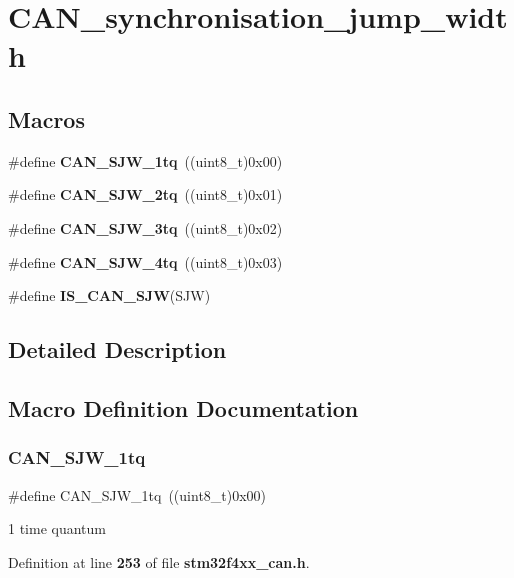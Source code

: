 \section{C\+A\+N\+\_\+synchronisation\+\_\+jump\+\_\+width}
\label{group__CAN__synchronisation__jump__width}
\subsection*{Macros}
\begin{DoxyCompactItemize}
\item 
\#define \textbf{ C\+A\+N\+\_\+\+S\+J\+W\+\_\+1tq}~((uint8\+\_\+t)0x00)
\item 
\#define \textbf{ C\+A\+N\+\_\+\+S\+J\+W\+\_\+2tq}~((uint8\+\_\+t)0x01)
\item 
\#define \textbf{ C\+A\+N\+\_\+\+S\+J\+W\+\_\+3tq}~((uint8\+\_\+t)0x02)
\item 
\#define \textbf{ C\+A\+N\+\_\+\+S\+J\+W\+\_\+4tq}~((uint8\+\_\+t)0x03)
\item 
\#define \textbf{ I\+S\+\_\+\+C\+A\+N\+\_\+\+S\+JW}(S\+JW)
\end{DoxyCompactItemize}


\subsection{Detailed Description}


\subsection{Macro Definition Documentation}
\mbox{\label{group__CAN__synchronisation__jump__width_ga4e03d22ae683b63cb4df238449ec967c}} 
\subsubsection{C\+A\+N\+\_\+\+S\+J\+W\+\_\+1tq}
{\footnotesize\ttfamily \#define C\+A\+N\+\_\+\+S\+J\+W\+\_\+1tq~((uint8\+\_\+t)0x00)}

1 time quantum 

Definition at line \textbf{ 253} of file \textbf{ stm32f4xx\+\_\+can.\+h}.

